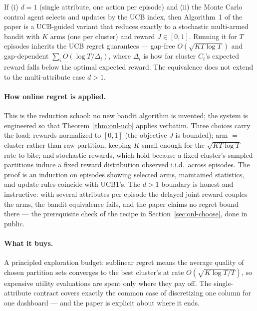 \begin{theorem}
\label{thm:onl-quill-ucb}
If (i) $d = 1$ (single attribute, one action per episode) and (ii) the Monte
Carlo control agent selects and updates by the UCB index, then Algorithm~1 of
the paper is a UCB-guided variant that reduces exactly to a stochastic
multi-armed bandit with $K$ arms (one per cluster) and reward $J \in [0,1]$.
Running it for $T$ episodes inherits the UCB regret guarantees --- gap-free
$O(\sqrt{KT\log T})$ and gap-dependent $\sum_i O(\log T/\Delta_i)$, where
$\Delta_i$ is how far cluster $C_i$'s expected reward falls below the optimal
expected reward. The equivalence does not extend to the multi-attribute case
$d > 1$. \eop
\end{theorem}

\paragraph{How online regret is applied.}
This is the reduction school: no new bandit algorithm is invented; the system
is engineered so that Theorem~\ref{thm:onl-ucb} applies verbatim. Three
choices carry the load: rewards normalized to $[0,1]$ (the objective $J$ is
bounded); arm $=$ cluster rather than raw partition, keeping $K$ small enough
for the $\sqrt{KT\log T}$ rate to bite; and stochastic rewards, which hold
because a fixed cluster's sampled partitions induce a fixed reward
distribution observed i.i.d.\ across episodes. The proof is an induction on
episodes showing selected arms, maintained statistics, and update rules
coincide with UCB1's. The $d > 1$ boundary is honest and instructive: with
several attributes per episode the delayed joint reward couples the arms, the
bandit equivalence fails, and the paper claims no regret bound there --- the
prerequisite check of the recipe in Section~\ref{sec:onl-choose}, done in
public.

\paragraph{What it buys.}
A principled exploration budget: sublinear regret means the average quality of
chosen partition sets converges to the best cluster's at rate
$O(\sqrt{K\log T/T})$, so expensive utility evaluations are spent only where
they pay off. The single-attribute contract covers exactly the common case of
discretizing one column for one dashboard --- and the paper is explicit about
where it ends.

